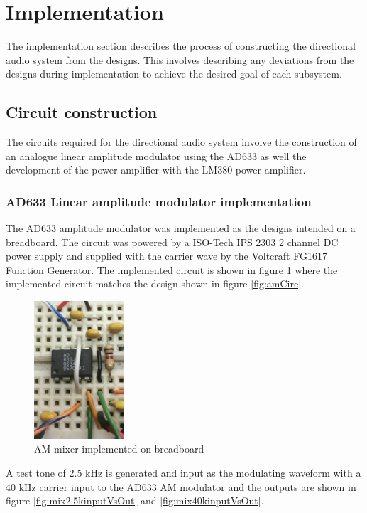 \section{Implementation}
The implementation section describes the process of constructing the directional audio system from the designs. This involves describing any deviations from the designs during implementation to achieve the desired goal of each subsystem.

\subsection{Circuit construction}
The circuits required for the directional audio system involve the construction of an analogue linear amplitude modulator using the AD633 as well the development of the power amplifier with the LM380 power amplifier.
\subsubsection{AD633 Linear amplitude modulator implementation}
The AD633 amplitude modulator was implemented as the designs intended on a breadboard. The circuit was powered by a ISO-Tech IPS 2303 2 channel DC power supply and supplied with the carrier wave by the Voltcraft FG1617 Function Generator.
The implemented circuit is shown in figure \ref{fig:mixerbb} where the implemented circuit matches the design shown in figure \ref{fig:amCirc}.

\begin{figure}[ht!]
    \centering
    \includegraphics[width=0.3\textwidth]{Figures/Implementation/Mixer/mixerbboard.png}
    \caption{AM mixer implemented on breadboard}
    \label{fig:mixerbb}
\end{figure}

A test tone of 2.5 kHz is generated and input as the modulating waveform with a 40 kHz carrier input to the AD633 AM modulator and the outputs are shown in figure \ref{fig:mix2.5kinputVsOut} and \ref{fig:mix40kinputVsOut}.

